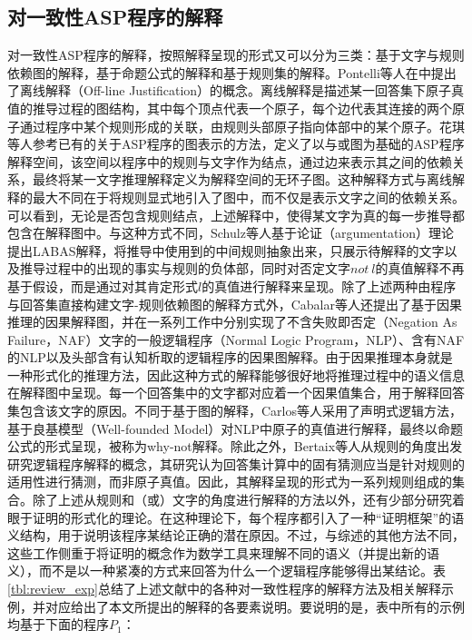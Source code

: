 \subsection{对一致性ASP程序的解释}
对一致性ASP程序的解释，按照解释呈现的形式又可以分为三类：基于文字与规则依赖图的解释，基于命题公式的解释和基于规则集的解释。Pontelli等人在\cite{pontelli2006justifications, pontelli2009justifications}中提出了离线解释（Off-line Justification）的概念。离线解释是描述某一回答集下原子真值的推导过程的图结构，其中每个顶点代表一个原子，每个边代表其连接的两个原子通过程序中某个规则形成的关联，由规则头部原子指向体部中的某个原子。花琪等人参考已有的关于ASP程序的图表示的方法\cite{albrecht2014construction,linke2005suitable}，定义了以与或图为基础的ASP程序解释空间\cite{huaqi2018lp}，该空间以程序中的规则与文字作为结点，通过边来表示其之间的依赖关系，最终将某一文字推理解释定义为解释空间的无环子图。这种解释方式与离线解释的最大不同在于将规则显式地引入了图中，而不仅是表示文字之间的依赖关系。可以看到，无论是否包含规则结点，上述解释中，使得某文字为真的每一步推导都包含在解释图中。与这种方式不同，Schulz等人基于论证（argumentation）理论提出LABAS解释\cite{schulz2013argumentationbased,schulz2016justifying}，将推导中使用到的中间规则抽象出来，只展示待解释的文字以及推导过程中的出现的事实与规则的负体部，同时对否定文字$not\ l$的真值解释不再基于假设，而是通过对其肯定形式$l$的真值进行解释来呈现。除了上述两种由程序与回答集直接构建文字-规则依赖图的解释方式外，Cabalar等人还提出了基于因果推理的因果解释图，并在一系列工作中分别实现了不含失败即否定（Negation As Failure，NAF）文字的一般逻辑程序（Normal Logic Program，NLP）、含有NAF的NLP以及头部含有认知析取的逻辑程序的因果图解释\cite{albrecht2014construction,cabalar2016justificationsa,cabalar2017enablers}。由于因果推理本身就是一种形式化的推理方法，因此这种方式的解释能够很好地将推理过程中的语义信息在解释图中呈现。每一个回答集中的文字都对应着一个因果值集合，用于解释回答集包含该文字的原因。不同于基于图的解释，Carlos等人采用了声明式逻辑方法，基于良基模型（Well-founded Model）对NLP中原子的真值进行解释，最终以命题公式的形式呈现，被称为why-not解释\cite{viegasdamasio2013justifications}。除此之外，Bertaix等人从规则的角度出发研究逻辑程序解释的概念，其研究认为回答集计算中的固有猜测应当是针对规则的适用性进行猜测，而非原子真值。因此，其解释呈现的形式为一系列规则组成的集合\cite{beatrix2016justifications}。除了上述从规则和（或）文字的角度进行解释的方法以外，还有少部分研究着眼于证明的形式化的理论\cite{denecker1993justification,denecker2015formal}。在这种理论下，每个程序都引入了一种“证明框架”的语义结构，用于说明该程序某结论正确的潜在原因。不过，与综述的其他方法不同，这些工作侧重于将证明的概念作为数学工具来理解不同的语义（并提出新的语义），而不是以一种紧凑的方式来回答为什么一个逻辑程序能够得出某结论。表\ref{tbl:review_exp}总结了上述文献中的各种对一致性程序的解释方法及相关解释示例，并对应给出了本文所提出的解释的各要素说明。要说明的是，表中所有的示例均基于下面的程序$P_1$：
